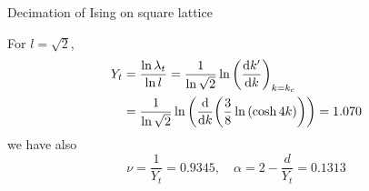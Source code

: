 \documentclass[../main/main.tex]{subfiles}
\begin{document}
\begin{example}{Decimation of Ising on square lattice}{}
\begin{enumerate}
For \( l = \sqrt{2}  \),
\begin{equation}
\begin{split}
Y_t  &= \frac{\ln{\lambda _t} }{\ln{l} } = \frac{1}{\ln{\sqrt{2} } } \ln{\qty(\dv{k'}{k})_{k=k_c} }   \\
& = \frac{1}{\ln{\sqrt{2} } }  \ln{\qty(\dv{}{k} \qty(\frac{3}{8} \ln{(\cosh 4k)} ) ) } = 1.070
\end{split}
\end{equation}
we have also
\begin{equation}
  \nu = \frac{1}{Y_t} = 0.9345, \quad \alpha = 2 - \frac{d}{Y_t} = 0.1313
\end{equation}
\end{enumerate}

\end{example}
\end{document}
